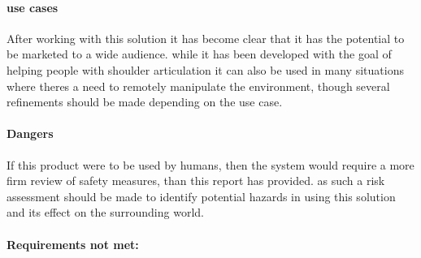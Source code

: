 \paragraph{use cases}
    After working with this solution it has become clear that it has the potential to be marketed to a wide audience. while it has been developed with the goal of helping people with shoulder articulation it can also be used in many situations where theres a need to remotely manipulate the environment, though several refinements should be made depending on the use case.
\paragraph{Dangers}
If this product were to be used by humans, then the system would require a more firm review of safety measures, than this report has provided. as such a risk assessment should be made to identify potential hazards in using this solution and its effect on the surrounding world.
\paragraph{Requirements not met:}

